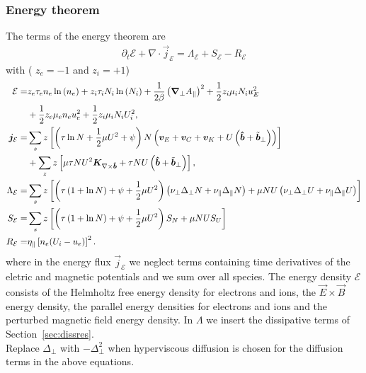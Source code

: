 \subsubsection{Energy theorem}
The terms of the energy theorem are
\begin{align} \label{eq:energy_theorem}
\partial_t \mathcal E +
\nabla \cdot \vec j_{\mathcal E}
= \Lambda_{\mathcal E}
+  S_{\mathcal E}
-  R_{\mathcal E}
\end{align}
with ( $z_e=-1$ and $z_i=+1$)
\begin{align} \label{eq:energy_conservation}
  \mathcal{E}= & z_e\tau_e n_e \ln{(n_e)} +z_i\tau_i N_i\ln{(N_i)}
  +\frac{1}{2\beta}\left({\boldsymbol{\nabla}}_\perp A_\parallel\right)^2
   +  \frac{1}{2} z_i \mu_i N_i u_E^2  \nonumber\\
   & +\frac{1}{2} z_e\mu_e  n_e u_e^2
  +\frac{1}{2} z_i\mu_i  N_i U_i^2,\\
  {\boldsymbol{j}}_{\mathcal E} =& \sum_s z\left[
  \left(\tau \ln N + \frac{1}{2}\mu U^2 + \psi \right)N\left(
  {\boldsymbol{v}}_E + {\boldsymbol{v}}_C + {\boldsymbol{v}}_{K} +U\left(\bm{\hat{b}}+\tilde{{\boldsymbol{b}}}_\perp\right)  \right) \right]
  \nonumber\\
  &+ \sum_z z\left[\mu \tau NU^2{\boldsymbol{K}}_{\nabla\times\bm{\hat{b}}} + \tau NU \left(\bm{\hat{b}} + \tilde{{\boldsymbol{b}}}_\perp\right)\right], \\
  \Lambda_{\mathcal E} =&  \sum_s z\left[\left( \tau\left( 1+\ln{N}\right) + \psi + \frac{1}{2} \mu U^2 \right)
  \left(\nu_\perp\Delta_\perp N + \nu_\parallel\Delta_\parallel N\right)  +  \mu NU\left(\nu_\perp\Delta_\perp U + \nu_\parallel\Delta_\parallel U\right) \right]
\nonumber \\
  S_{\mathcal E} =&  \sum_s  z\left[ \left(\tau\left( 1+\ln{N}\right) +\psi + \frac{1}{2} \mu U^2 \right)S_{N}  + \mu NU S_U\right]
\nonumber \\
  R_{\mathcal E} =&  \eta_\parallel  \left[ n_e(U_i-u_e)\right]^2.
\end{align}
where in the energy flux $\vec j_{\mathcal E}$
we neglect terms  containing time derivatives
of the eletric and magnetic potentials and we sum over all species.
The energy density $\mathcal E$ consists of the Helmholtz free energy density for electrons and ions,
the \(\vec{E} \times \vec{B}\) energy density, the parallel energy densities for electrons and ions and the perturbed magnetic field energy density.
In \(\Lambda\) we insert the dissipative terms of Section~\ref{sec:dissres}. \\
Replace $\Delta_\perp$ with $-\Delta_\perp^2$ when hyperviscous diffusion is chosen
for the diffusion terms in the above equations.

